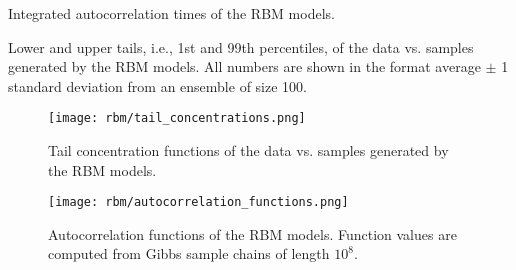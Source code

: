 \begin{table}[ht]
    \centering
    \begin{adjustbox}{max width=\textwidth}
        
    \end{adjustbox}
    \caption{Integrated autocorrelation times of the RBM models.}
    \label{tbl:rbm_ac_times}
\end{table}

\begin{table}[ht]
    \centering
    \begin{adjustbox}{max width=\textwidth}
        
    \end{adjustbox}
    \caption{Lower and upper tails, i.e., 1st and 99th percentiles, of the data vs. samples generated by the RBM models. All numbers are shown in the format average \(\pm\) 1 standard deviation from an ensemble of size 100.}
    \label{tbl:rbm_tails}
\end{table}

\begin{figure}[ht]
    \begin{center}
        \texttt{[image: rbm/tail\_concentrations.png]}
    \end{center}
    \caption{Tail concentration functions of the data vs. samples generated by the RBM models.}
    \label{fig:rbm_tail_concentrations}
\end{figure}

\begin{figure}[ht]
    \begin{center}
        \texttt{[image: rbm/autocorrelation\_functions.png]}
    \end{center}
    \caption{Autocorrelation functions of the RBM models. Function values are computed from Gibbs sample chains of length \( 10^8 \).}
    \label{fig:rbm_autocorrelation_functions}
\end{figure}
